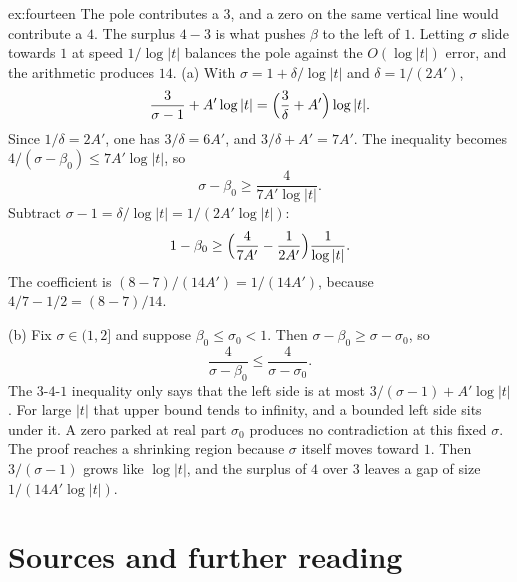 \begin{solution}{ex:fourteen}
\idea The pole contributes a $3$, and a zero on the same vertical line would contribute a $4$. The surplus $4-3$ is what pushes $\beta$ to the left of $1$. Letting $\sigma$ slide towards $1$ at speed $1/\log|t|$ balances the pole against the $O(\log|t|)$ error, and the arithmetic produces $14$.
\writeup (a) With $\sigma=1+\delta/\log|t|$ and $\delta=1/(2A')$,
\[
\frac3{\sigma-1}+A'\log|t|=\Bigl(\frac3\delta+A'\Bigr)\log|t|.
\]
Since $1/\delta=2A'$, one has $3/\delta=6A'$, and $3/\delta+A'=7A'$. The inequality becomes $4/(\sigma-\beta_0)\le7A'\log|t|$, so
\[
\sigma-\beta_0\ge\frac4{7A'\log|t|}.
\]
Subtract $\sigma-1=\delta/\log|t|=1/(2A'\log|t|)$:
\[
1-\beta_0\ge\Bigl(\frac4{7A'}-\frac1{2A'}\Bigr)\frac1{\log|t|}.
\]
The coefficient is $(8-7)/(14A')=1/(14A')$, because $4/7-1/2=(8-7)/14$.

(b) Fix $\sigma\in(1,2]$ and suppose $\beta_0\le\sigma_0<1$. Then $\sigma-\beta_0\ge\sigma-\sigma_0$, so
\[
\frac4{\sigma-\beta_0}\le\frac4{\sigma-\sigma_0}.
\]
The $3$-$4$-$1$ inequality only says that the left side is at most $3/(\sigma-1)+A'\log|t|$. For large $|t|$ that upper bound tends to infinity, and a bounded left side sits under it. A zero parked at real part $\sigma_0$ produces no contradiction at this fixed $\sigma$. The proof reaches a shrinking region because $\sigma$ itself moves toward $1$. Then $3/(\sigma-1)$ grows like $\log|t|$, and the surplus of $4$ over $3$ leaves a gap of size $1/(14A'\log|t|)$.
\end{solution}

\section*{Sources and further reading}

